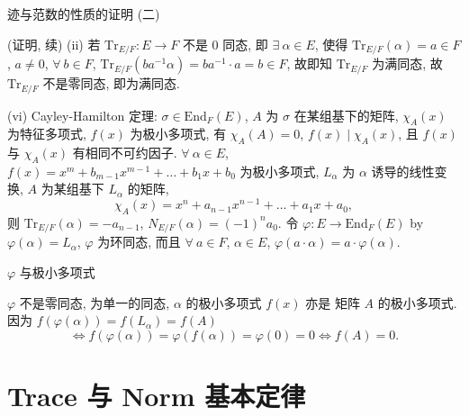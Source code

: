 
\begin{frame}{迹与范数的性质的证明 (二)}

\startproof[bg=yellow, fg=red](证明, 续)
(ii) 若 $\mathrm{Tr}_{E/F}: E \to F$ 不是 0 同态,
即 $\exists\ \alpha \in E$, 使得 $\mathrm{Tr}_{E/F}(\alpha) = a \in F$,
$a \neq 0$, $\forall\ b \in F$,
$\mathrm{Tr}_{E/F}(ba^{-1}\alpha) = ba^{-1} \cdot a = b \in F$,
故即知 $\mathrm{Tr}_{E/F}$ 为满同态,
故 $\mathrm{Tr}_{E/F}$ 不是零同态, 即为满同态.

\pause

(vi) Cayley-Hamilton 定理: $\sigma \in \mathrm{End}_F(E)$, $A$ 为 $\sigma$
在某组基下的矩阵, $\chi_A(x)$ 为特征多项式, $f(x)$ 为极小多项式,
有 $\chi_A(A) = 0$, $f(x) \mid \chi_A(x)$, 且 $f(x)$ 与 $\chi_A(x)$
有相同不可约因子.
$\forall\ \alpha \in E$,
$f(x) = x^m + b_{m-1}x^{m-1} + \dots + b_1 x + b_0$ 为极小多项式,
$L_\alpha$ 为 $\alpha$ 诱导的线性变换, $A$ 为某组基下 $L_\alpha$ 的矩阵,
\[
\chi_A(x) = x^n + a_{n-1}x^{n-1} + \dots + a_1 x + a_0,
\]
则 $\mathrm{Tr}_{E/F}(\alpha) = -a_{n-1}$, $N_{E/F}(\alpha) = (-1)^n a_0$.
令 $\varphi: E \to \mathrm{End}_F(E)$ by $\varphi(\alpha) = L_\alpha$,
$\varphi$ 为环同态, 而且 $\forall\ a \in F$, $\alpha \in E$,
$\varphi(a \cdot \alpha) = a \cdot \varphi(\alpha)$.

\end{frame}


\begin{frame}{$\varphi$ 与极小多项式}

$\varphi$ 不是零同态, 为单一的同态, $\alpha$ 的极小多项式 $f(x)$ 亦是
矩阵 $A$ 的极小多项式.
因为 $f(\varphi(\alpha)) = f(L_\alpha) = f(A)$
\[
\iff f(\varphi(\alpha)) = \varphi(f(\alpha)) = \varphi(0) = 0
\iff f(A) = 0.
\]

\end{frame}


\section[基本定律]{Trace 与 Norm 基本定律}


